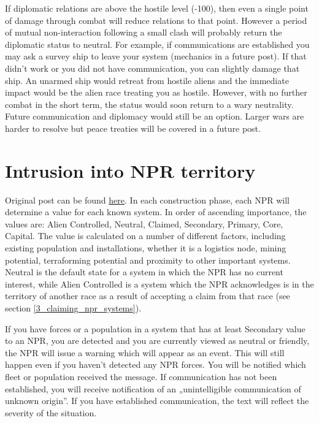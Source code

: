 \documentclass[../Aurora C# unofficial manual.tex]{subfiles}
\begin{document}
	If diplomatic relations are above the hostile level (-100), then even a single point of damage through combat will reduce relations to that point. However a period of mutual non-interaction following a small clash will probably return the diplomatic status to neutral. For example, if communications are established you may ask a survey ship to leave your system (mechanics in a future post). If that didn't work or you did not have communication, you can slightly damage that ship. An unarmed ship would retreat from hostile aliens and the immediate impact would be the alien race treating you as hostile. However, with no further combat in the short term, the status would soon return to a wary neutrality. Future communication and diplomacy would still be an option. Larger wars are harder to resolve but peace treaties will be covered in a future post.
	
	\section{Intrusion into NPR territory}\label{2_intrusion_into_npr}
	Original post can be found
	\href{http://aurora2.pentarch.org/index.php?topic=8495.msg118318#msg118318}{here}.
	\newline\newline
	In each construction phase, each NPR will determine a value for each known system. In order of ascending importance, the values are: Alien Controlled, Neutral, Claimed, Secondary, Primary, Core, Capital. The value is calculated on a number of different factors, including existing population and installations, whether it is a logistics node, mining potential, terraforming potential and proximity to other important systems. Neutral is the default state for a system in which the NPR has no current interest, while Alien Controlled is a system which the NPR acknowledges is in the territory of another race as a result of accepting a claim from that race (see section \ref{3_claiming_npr_systems}).
	
	If you have forces or a population in a system that has at least Secondary value to an NPR, you are detected and you are currently viewed as neutral or friendly, the NPR will issue a warning which will appear as an event. This will still happen even if you haven't detected any NPR forces. You will be notified which fleet or population received the message. If communication has not been established, you will receive notification of an „unintelligible communication of unknown origin”. If you have established communication, the text will reflect the severity of the situation.
	
\end{document}
